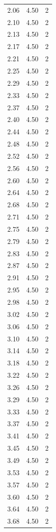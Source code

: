 \begin{longtable}{lrr}
  2.06 & 4.50 & 2 \\
  2.10 & 4.50 & 2 \\
  2.13 & 4.50 & 2 \\
  2.17 & 4.50 & 2 \\
  2.21 & 4.50 & 2 \\
  2.25 & 4.50 & 2 \\
  2.29 & 4.50 & 2 \\
  2.33 & 4.50 & 2 \\
  2.37 & 4.50 & 2 \\
  2.40 & 4.50 & 2 \\
  2.44 & 4.50 & 2 \\
  2.48 & 4.50 & 2 \\
  2.52 & 4.50 & 2 \\
  2.56 & 4.50 & 2 \\
  2.60 & 4.50 & 2 \\
  2.64 & 4.50 & 2 \\
  2.68 & 4.50 & 2 \\
  2.71 & 4.50 & 2 \\
  2.75 & 4.50 & 2 \\
  2.79 & 4.50 & 2 \\
  2.83 & 4.50 & 2 \\
  2.87 & 4.50 & 2 \\
  2.91 & 4.50 & 2 \\
  2.95 & 4.50 & 2 \\
  2.98 & 4.50 & 2 \\
  3.02 & 4.50 & 2 \\
  3.06 & 4.50 & 2 \\
  3.10 & 4.50 & 2 \\
  3.14 & 4.50 & 2 \\
  3.18 & 4.50 & 2 \\
  3.22 & 4.50 & 2 \\
  3.26 & 4.50 & 2 \\
  3.29 & 4.50 & 2 \\
  3.33 & 4.50 & 2 \\
  3.37 & 4.50 & 2 \\
  3.41 & 4.50 & 2 \\
  3.45 & 4.50 & 2 \\
  3.49 & 4.50 & 2 \\
  3.53 & 4.50 & 2 \\
  3.57 & 4.50 & 2 \\
  3.60 & 4.50 & 2 \\
  3.64 & 4.50 & 2 \\
  3.68 & 4.50 & 2 \\

\end{longtable}
